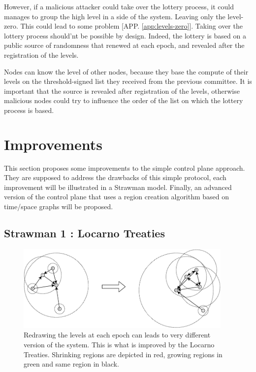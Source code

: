 \documentclass[a4paper,11pt,oneside]{report}
\begin{document}
However, if a malicious attacker could take over the lottery process, it could
manages to group the high level in a side of the system. Leaving only the
level-zero. This could lead to some problem [APP. \autoref{app:levels-zero}].
Taking over the lottery process should'nt be possible by design.
Indeed, the lottery is based on a public source of randomness that renewed at
each epoch, and revealed after the registration of the levels. 

Nodes can know the level of other nodes, because they base the compute of their
levels on the threshold-signed list they received from the previous committee.
It is important that the source is revealed after registration of the levels,
otherwise malicious nodes could try to influence the order of the list on which
the lottery process is based. 



\chapter{Improvements} \label{chap:Improvements}
This section proposes some improvements to the simple control plane approach. They
are supposed to address the drawbacks of this simple protocol, each improvement
will be illustrated in a Strawman model. Finally, an advanced
version of the control plane that uses a region creation algorithm based on
time/space graphs will be proposed. 

\section{Strawman 1 : Locarno Treaties} \label{Locarno}

\begin{figure}[!h] 
\centering
\includegraphics[width=300pt]{figures/LocarnoTreaties-Redrawing}
\caption{Redrawing the levels at each epoch can leads to very different version
    of the system. This is what is improved by the Locarno Treaties. Shrinking
    regions are depicted in red, growing regions in green and same region in
    black.} \label{fig:LocarnoTreaties-Redrawing}
\end{figure}
\end{document}
